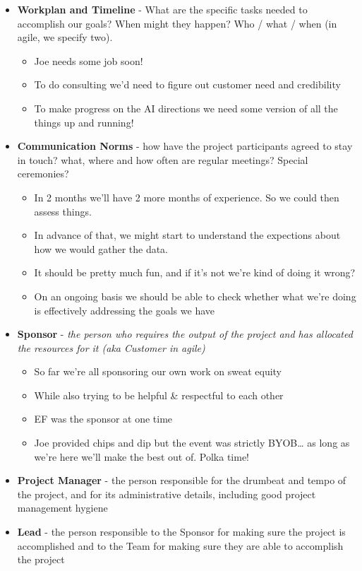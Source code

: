\documentclass[11pt]{article}
\begin{document}
\begin{itemize}
\item \textbf{Workplan and Timeline} - What are the specific tasks needed to accomplish our goals? When might they happen? Who / what / when (in agile, we specify two).
\begin{itemize}
\item Joe needs some job soon!
\item To do consulting we’d need to figure out customer need and credibility
\item To make progress on the AI directions we need some version of all the things up and running!
\end{itemize}
\item \textbf{Communication Norms} - how have the project participants agreed to stay in touch? what, where and how often are regular meetings? Special ceremonies?
\begin{itemize}
\item In 2 months we’ll have 2 more months of experience.  So we could then assess things.
\item In advance of that, we might start to understand the expections about how we would gather the data.
\item It should be pretty much fun, and if it’s not we’re kind of doing it wrong?
\item On an ongoing basis we should be able to check whether what we’re doing is effectively addressing the goals we have
\end{itemize}
\item \textbf{Sponsor} - \emph{the person who requires the output of the project and has allocated the resources for it (aka Customer in agile)}
\begin{itemize}
\item So far we’re all sponsoring our own work on sweat equity
\item While also trying to be helpful \& respectful to each other
\item EF was the sponsor at one time
\item Joe provided chips and dip but the event was strictly BYOB\ldots{} as long as we’re here we’ll make the best out of.  Polka time!
\end{itemize}
\item \textbf{Project Manager} - the person responsible for the drumbeat and tempo of the project, and for its administrative details, including good project management hygiene
\item \textbf{Lead} - the person responsible to the Sponsor for making sure the project is accomplished and to the Team for making sure they are able to accomplish the project

\end{itemize}
\end{document}
